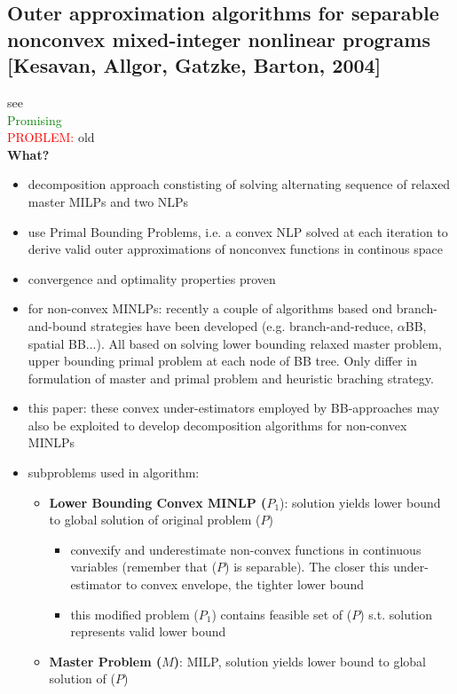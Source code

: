 \documentclass{article}
\begin{document}
\subsection{Outer approximation algorithms for separable nonconvex mixed-integer nonlinear programs [Kesavan, Allgor, Gatzke, Barton, 2004]}
see \cite{kesavan2004outer}\\
\textcolor{green}{Promising}\\
\textcolor{red}{PROBLEM:} old\\
\textbf{What?} 
\begin{itemize}
\item  decomposition approach constisting of solving alternating sequence of relaxed master MILPs and two NLPs
\item use Primal Bounding Problems, i.e. a convex NLP solved at each iteration to derive valid outer approximations of nonconvex functions in continous space
\item convergence and optimality properties proven
\item for non-convex MINLPs: recently a couple of algorithms based ond branch-and-bound strategies have been developed (e.g. branch-and-reduce, $\alpha$BB, spatial BB...). All based on solving lower bounding relaxed master problem, upper bounding primal problem at each node of BB tree. Only differ in formulation of master and primal problem and heuristic braching strategy.
\item this paper: these convex under-estimators employed by BB-approaches may also be exploited to develop decomposition algorithms for non-convex MINLPs
\item subproblems used in algorithm:	
	\begin{itemize}
	\item \textbf{Lower Bounding Convex MINLP ($P_1$}): solution yields lower bound to global solution of original problem ($P$)
		\begin{itemize}
		\item convexify and underestimate non-convex functions in continuous variables (remember that ($P$) is separable). The closer this under-estimator to convex envelope, the tighter lower bound
		\item this modified problem ($P_1$) contains feasible set of ($P$) s.t. solution represents valid lower bound
		\end{itemize}
	\item \textbf{Master Problem ($M$)}: MILP, solution yields lower bound to global solution of ($P$)
		\begin{itemize}

\end{itemize}
\end{itemize}
\end{itemize}
\end{document}
